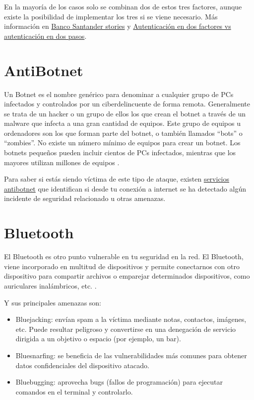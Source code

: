 \documentclass[
  spanish,
  a4paper,
  openany]{book}
\begin{document}
En la mayoría de los casos solo se combinan dos de estos tres factores, aunque existe la posibilidad de implementar los tres si se viene necesario. Más información en \href{https://www.santander.com/es/stories/pon-una-capa-extra-de-seguridad-online-con-la-autenticacion-multifactor}{Banco Santander stories} y \href{https://protegermipc.net/2016/03/18/autenticacion-en-dos-factores-vs-autenticacion-en-dos-pasos/}{Autenticación en dos factores vs autenticación en dos pasos}.

\hypertarget{antibotnet}{%
\section{AntiBotnet}\label{antibotnet}}

Un Botnet es el nombre genérico para denominar a cualquier grupo de PCs infectados y controlados por un ciberdelincuente de forma remota. Generalmente se trata de un hacker o un grupo de ellos los que crean el botnet a través de un malware que infecta a una gran cantidad de equipos. Este grupo de equipos u ordenadores son los que forman parte del botnet, o también llamados ``bots'' o ``zombies''. No existe un número mínimo de equipos para crear un botnet. Los botnets pequeños pueden incluir cientos de PCs infectados, mientras que los mayores utilizan millones de equipos \citep{INCI-botnet}.

Para saber si estás siendo víctima de este tipo de ataque, existen \href{https://www.osi.es/es/servicio-antibotnet}{servicios antibotnet} que identifican si desde tu conexión a internet se ha detectado algún incidente de seguridad relacionado u otras amenazas.

\hypertarget{bluetooth}{%
\section{Bluetooth}\label{bluetooth}}

El Bluetooth es otro punto vulnerable en tu seguridad en la red. El Bluetooth, viene incorporado en multitud de dispositivos y permite conectarnos con otro dispositivo para compartir archivos o emparejar determinados dispositivos, como auriculares inalámbricos, etc. \citep{IONOS-bluetooh}.

Y sus principales amenazas son:

\begin{itemize}
\item
  Bluejacking: envían spam a la víctima mediante notas, contactos, imágenes, etc. Puede resultar peligroso y convertirse en una denegación de servicio dirigida a un objetivo o espacio (por ejemplo, un bar).
\item
  Bluesnarfing: se beneficia de las vulnerabilidades más comunes para obtener datos confidenciales del dispositivo atacado.
\item
  Bluebugging: aprovecha bugs (fallos de programación) para ejecutar comandos en el terminal y controlarlo.
\end{itemize}
\end{document}
